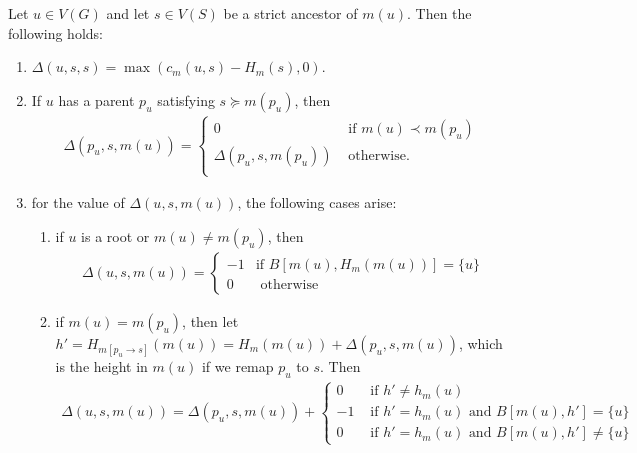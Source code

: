 \documentclass[10pt]{article}
\begin{document}
\begin{lemmarep}\label{lem:deltauss}
    Let $u \in V(G)$ and let $s \in V(S)$ be a strict ancestor of $m(u)$.  Then the following holds:
    \begin{enumerate}
    \item 
    $\Delta(u, s, s) = \max(c_m(u, s) - H_m(s), 0)$.
    

    \item 
    If $u$ has a parent $p_u$ satisfying $s \succeq m(p_u)$, then 
    \begin{align*}
        \Delta(p_u, s, m(u)) = \begin{cases}
            0 &\mbox{ if $m(u) \prec m(p_u)$} \\
            \Delta(p_u, s, m(p_u)) &\mbox{ otherwise.} \\
        \end{cases}   
    \end{align*}

    
        \item 
        for the value of $\Delta(u, s, m(u))$, the following cases arise:

        \begin{enumerate}
            \item 
        if $u$ is a root or $m(u) \neq m(p_u)$, then
        \begin{align*}
            \Delta(u, s, m(u)) = \begin{cases}
                -1 &\mbox{if  $B[m(u), H_m(m(u))] = \{u\}$} \\
                0 &\mbox{ otherwise} 
            \end{cases}
        \end{align*}


        \item 
        if $m(u) = m(p_u)$, then let $h' = H_{m[p_u \rightarrow s]}(m(u)) = H_m(m(u)) + \Delta(p_u, s, m(u))$, which is the height in $m(u)$ if we remap $p_u$ to $s$.  
        Then
        \begin{align*}
            \Delta(u, s, m(u)) = \Delta(p_u, s, m(u)) + \begin{cases}
                0 &\mbox{ if $h' \neq h_m(u)$} \\
                -1 &\mbox{ if $h' = h_m(u)$ and $B[m(u), h'] = \{u\}$} \\
                0 &\mbox{ if $h' = h_m(u)$ and $B[m(u), h'] \neq \{u\}$} 
            \end{cases}
        \end{align*}
    \end{enumerate}
    


    
\end{enumerate}
\end{lemmarep}
\end{document}
